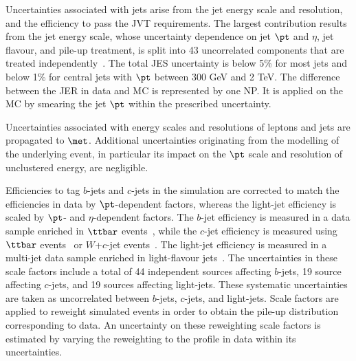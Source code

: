 \documentclass[PAPER, coverpage, atlasdraft=true, texlive=2016, UKenglish]{\ATLASLATEXPATH atlasdoc} %
\begin{document}
Uncertainties associated with jets arise from the jet energy scale
and resolution, and the efficiency to pass the JVT requirements. 
The largest contribution results from the jet energy scale, whose uncertainty dependence on jet $\pt$ and $\eta$, jet flavour, and pile-up treatment, 
is split into 43 uncorrelated components that are treated independently~\cite{Aaboud:2017jcu}. The total JES uncertainty is
below 5\% for most jets and below 1\% for central jets with $\pt$ between 300 GeV and 2 TeV. The difference between the JER
in data and MC is represented by one NP. It is applied on the MC by smearing the jet $\pt$ within the prescribed uncertainty.

Uncertainties associated with energy scales and resolutions of leptons and jets 
are propagated to $\met$. Additional uncertainties originating from the modelling 
of the underlying event, in particular its impact on the $\pt$ scale and resolution 
of unclustered energy, are negligible.

Efficiencies to tag $b$-jets and $c$-jets in the simulation are corrected to match the efficiencies in data by $\pt$-dependent factors,
whereas the light-jet efficiency is scaled by $\pt$- and $\eta$-dependent factors.
The $b$-jet efficiency is measured in a data sample enriched in $\ttbar$ events~\cite{Aad:2019epj79}, %
  while the $c$-jet efficiency is measured
using $\ttbar$ events~\cite{ATLAS-CONF-2018-001} or $W$+$c$-jet events~\cite{Aad:2015ydr}. 
The light-jet efficiency is measured in a multi-jet data sample enriched in light-flavour jets~\cite{ATLAS-CONF-2018-006}.
The uncertainties in these scale factors include a total of 44 independent sources affecting $b$-jets, 19 source affecting $c$-jets, and 19 sources affecting light-jets. 
These systematic uncertainties are taken as uncorrelated between $b$-jets, $c$-jets, and light-jets.
Scale factors are applied to reweight simulated events in order to obtain the pile-up distribution corresponding to data.
An uncertainty on these reweighting scale factors is estimated by varying the reweighting to the profile in data within its uncertainties.
\end{document}
